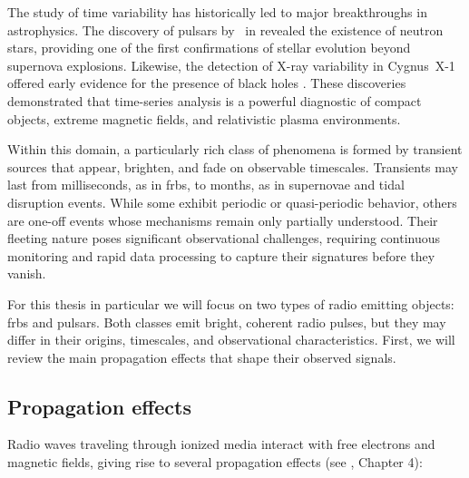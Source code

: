 The study of time variability has historically led to major breakthroughs in astrophysics. The discovery of pulsars by \citeauthor{Hewish1968}\ in \citeyear{Hewish1968} revealed the existence of neutron stars, providing one of the first confirmations of stellar evolution beyond supernova explosions. Likewise, the detection of X-ray variability in Cygnus~X-1 offered early evidence for the presence of black holes \citep{CygnusX1_1972}. These discoveries demonstrated that time-series analysis is a powerful diagnostic of compact objects, extreme magnetic fields, and relativistic plasma environments.

Within this domain, a particularly rich class of phenomena is formed by transient sources that appear, brighten, and fade on observable timescales. Transients may last from milliseconds, as in \glspl{frb}, to months, as in supernovae and tidal disruption events. While some exhibit periodic or quasi-periodic behavior, others are one-off events whose mechanisms remain only partially understood. Their fleeting nature poses significant observational challenges, requiring continuous monitoring and rapid data processing to capture their signatures before they vanish.

For this thesis in particular we will focus on two types of radio emitting objects: \glspl{frb} and pulsars. Both classes emit bright, coherent radio pulses, but they may differ in their origins, timescales, and observational characteristics. First, we will review the main propagation effects that shape their observed signals.

\subsection{Propagation effects}
\label{sec:propagation_effects}
Radio waves traveling through ionized media interact with free electrons and magnetic fields, giving rise to several propagation effects (see \citealt{Lorimer2004}, Chapter 4):

